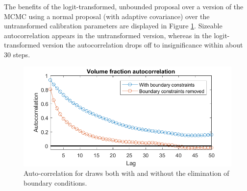 \documentclass{article}
\begin{document}
The benefits of the logit-transformed, unbounded proposal over a version of the MCMC using a normal proposal (with adaptive covariance) over the untransformed calibration parameters are displayed in Figure \ref{ACFs}. Sizeable autocorrelation appears in the untransformed version, whereas in the logit-transformed version the autocorrelation drops off to insignificance within about 30 steps.

\begin{figure}
\centering
\includegraphics[width=.65\linewidth]{ACF_bnd_cnds_fig}
\captionsetup{width=.65\linewidth}
\caption{Auto-correlation for draws both with and without the elimination of boundary conditions.}
\label{ACFs}
\end{figure}
\end{document}
